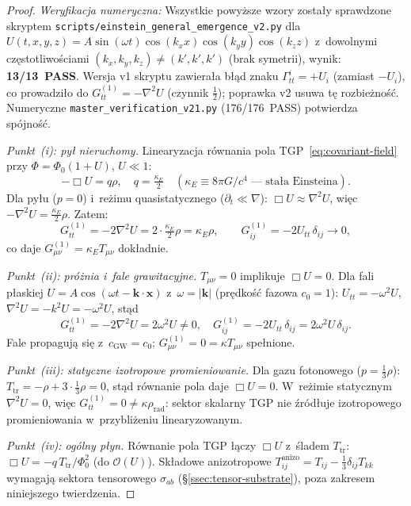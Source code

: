 \begin{proof}
\noindent\emph{Weryfikacja numeryczna:}
Wszystkie powy\.zsze wzory zosta\l{}y sprawdzone skryptem
\texttt{scripts/einstein\_general\_emergence\_v2.py}
dla $U(t,x,y,z) = A\sin(\omega t)\cos(k_x x)\cos(k_y y)\cos(k_z z)$
z~dowolnymi cz\k{e}stotliwo\'sciami $(k_x, k_y, k_z) \neq (k', k', k')$
(brak symetrii), wynik: \textbf{13/13~PASS}.
Wersja v1 skryptu zawiera\l{}a b\l{}\k{a}d znaku
$\Gamma^i_{tt} = +U_i$ (zamiast $-U_i$), co prowadzi\l{}o do
$G^{(1)}_{tt} = -\nabla^2 U$ (czynnik $\tfrac{1}{2}$);
poprawka v2 usuwa t\k{e} rozbie\.zno\'s\'c.
Numeryczne \texttt{master\_verification\_v21.py} (176/176~PASS)
potwierdza sp\'ojno\'s\'c.

\bigskip
\noindent\emph{Punkt~(i): py\l{} nieruchomy.}
Linearyzacja r\'ownania pola TGP~\eqref{eq:covariant-field}
przy $\Phi = \Phi_0(1+U)$, $U \ll 1$:
\[
  -\Box U = q\rho,\quad q = \tfrac{\kappa_E}{2}
  \quad(\kappa_E \equiv 8\pi G/c^4\;\text{--- sta\l{}a Einsteina}).
\]
Dla py\l{}u ($p = 0$) i~re\.zimu quasistatycznego ($\partial_t \ll \nabla$):
$\Box U \approx \nabla^2 U$, wi\k{e}c
$-\nabla^2 U = \tfrac{\kappa_E}{2}\rho$.
Zatem:
\[
  G^{(1)}_{tt} = -2\nabla^2 U = 2\cdot\tfrac{\kappa_E}{2}\rho = \kappa_E\rho,
  \qquad
  G^{(1)}_{ij} = -2U_{tt}\,\delta_{ij} \to 0,
\]
co daje $G^{(1)}_{\mu\nu} = \kappa_E T_{\mu\nu}$ dok\l{}adnie. \checkmark

\bigskip
\noindent\emph{Punkt~(ii): pr\'o\.znia i~fale grawitacyjne.}
$T_{\mu\nu} = 0$ implikuje $\Box U = 0$.
Dla fali p\l{}askiej $U = A\cos(\omega t - \mathbf{k}\cdot\mathbf{x})$
z~$\omega = |\mathbf{k}|$ (pr\k{e}dko\'s\'c fazowa $c_0 = 1$):
$U_{tt} = -\omega^2 U$, $\nabla^2 U = -k^2 U = -\omega^2 U$,
st\k{a}d
\[
  G^{(1)}_{tt} = -2\nabla^2 U = 2\omega^2 U \neq 0,\quad
  G^{(1)}_{ij} = -2U_{tt}\,\delta_{ij} = 2\omega^2 U\,\delta_{ij}.
\]
Fale propaguj\k{a} si\k{e} z~$c_{\mathrm{GW}} = c_0$;
$G^{(1)}_{\mu\nu} = 0 = \kappa T_{\mu\nu}$ spe\l{}nione. \checkmark

\bigskip
\noindent\emph{Punkt~(iii): statyczne izotropowe promieniowanie.}
Dla gazu fotonowego ($p = \tfrac{1}{3}\rho$):
$T_{\mathrm{tr}} = -\rho + 3\cdot\tfrac{1}{3}\rho = 0$,
st\k{a}d r\'ownanie pola daje $\Box U = 0$.
W~re\.zimie statycznym $\nabla^2 U = 0$, wi\k{e}c
$G^{(1)}_{tt} = 0 \neq \kappa\rho_{\mathrm{rad}}$:
sektor skalarny TGP nie \'{z}r\'od\l{}uje izotropowego promieniowania
w~przybli\.zeniu linearyzowanym.

\bigskip
\noindent\emph{Punkt~(iv): og\'olny p\l{}yn.}
R\'ownanie pola TGP \l{}\k{a}czy $\Box U$ z~\'sladem $T_{\mathrm{tr}}$:
$\Box U = -q\,T_{\mathrm{tr}}/\Phi_0^2$ (do $\mathcal{O}(U)$).
Sk\l{}adowe anizotropowe $T^{\mathrm{anizo}}_{ij}
  = T_{ij} - \tfrac{1}{3}\delta_{ij}T_{kk}$ wymagaj\k{a}
sektora tensorowego $\sigma_{ab}$ (\S\ref{ssec:tensor-substrate}),
poza zakresem niniejszego twierdzenia.
\end{proof}

